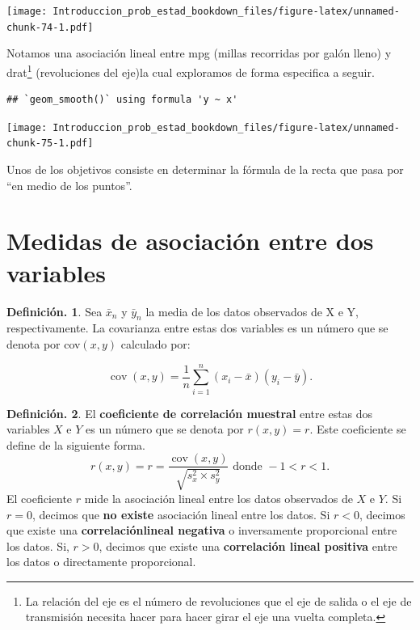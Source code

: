 \documentclass[]{book}
\theoremstyle{definition}
\newtheorem{definition}{Definición.}[chapter]
\theoremstyle{definition}
\theoremstyle{definition}
\theoremstyle{remark}
\begin{document}
\texttt{[image: Introduccion\_prob\_estad\_bookdown\_files/figure-latex/unnamed-chunk-74-1.pdf]}

Notamos una asociación lineal entre mpg (millas
recorridas por galón lleno) y drat\footnote{La relación del eje
  es el número de revoluciones que el eje de salida o el
  eje de transmisión necesita hacer para hacer girar el
  eje una vuelta completa.} (revoluciones del eje)la
cual exploramos
de forma especifica a seguir.

\begin{verbatim}
## `geom_smooth()` using formula 'y ~ x'
\end{verbatim}

\texttt{[image: Introduccion\_prob\_estad\_bookdown\_files/figure-latex/unnamed-chunk-75-1.pdf]}

Unos de los objetivos consiste en determinar la
fórmula de la
recta que pasa por ``en medio de los puntos''.

\hypertarget{medidas-de-asociaciuxf3n-entre-dos-variables}{%
\section{Medidas de asociación entre dos variables}\label{medidas-de-asociaciuxf3n-entre-dos-variables}}

\begin{definition}
\protect\hypertarget{def:unnamed-chunk-76}{}{\label{def:unnamed-chunk-76} }Sea \(\bar{x}_n\) y \(\bar{y}_n\) la
media de los datos observados de X e Y,
respectivamente. La
covarianza entre estas dos variables es un
número que se denota por cov\((x,y)\) calculado por:

\[ \operatorname{cov}(x,y)=\frac{1}{n}\sum_{i=1}^
{n}\left(x_{i}-
 \bar{x}\right)\left(y_{i}-\bar{y}\right). \]
\end{definition}

\begin{definition}
\protect\hypertarget{def:unnamed-chunk-77}{}{\label{def:unnamed-chunk-77} }El \textbf{coeficiente de correlación muestral} entre
estas dos
variables \(X\) e \(Y\) es un número que se denota
por \(r(x, y)=r\).
Este
coeficiente se define de la siguiente forma.
\[r(x,y)= r =\frac{\operatorname{cov}(x,y)}{\sqrt
  { s_x^2  \times s_y^2}} \mbox{ donde
    } -1 < r < 1.\]
El coeficiente \(r\) mide la asociación lineal entre
los datos
observados de \(X\) e \(Y\).
Si \(r = 0\), decimos que \textbf{no existe} asociación
lineal entre
los datos. Si \(r<0\), decimos que existe una
\textbf{correlaciónlineal
negativa} o inversamente proporcional entre los
datos. Si, \(r > 0\), decimos que existe una \textbf{correlación lineal
positiva} entre
los datos o directamente proporcional.
\end{definition}
\end{document}
